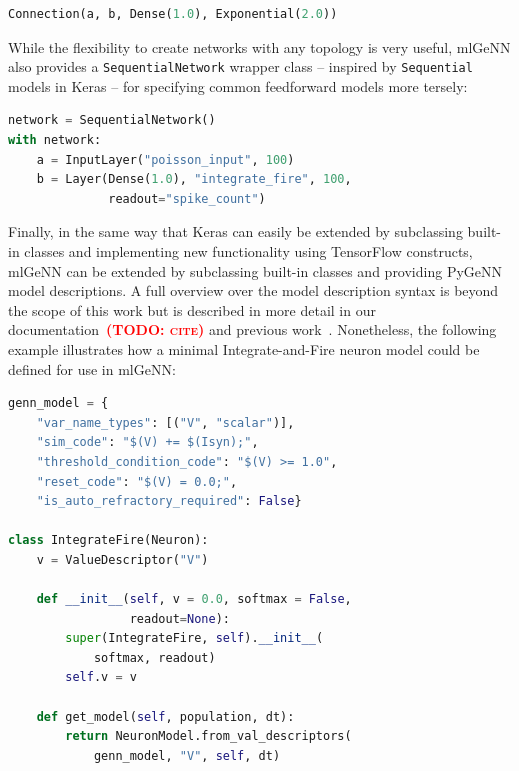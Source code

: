 \documentclass[sigconf]{acmart}
\newcommand{\todo}[1]{\textbf{\textsc{\textcolor{red}{(TODO: #1)}}}}
\begin{document}
\begin{lstlisting}[language=Python]
Connection(a, b, Dense(1.0), Exponential(2.0))
\end{lstlisting}

While the flexibility to create networks with any topology is very useful, mlGeNN also provides a \lstinline{SequentialNetwork} wrapper class -- inspired by \lstinline{Sequential} models in Keras -- for specifying common feedforward models more tersely:
\begin{lstlisting}[language=Python]
network = SequentialNetwork()
with network:
    a = InputLayer("poisson_input", 100)
    b = Layer(Dense(1.0), "integrate_fire", 100,
              readout="spike_count")
\end{lstlisting}
Finally, in the same way that Keras can easily be extended by subclassing built-in classes and implementing new functionality using TensorFlow constructs, mlGeNN can be extended by subclassing  built-in classes and providing PyGeNN model descriptions. 
A full overview over the model description syntax is beyond the scope of this work but is described in more detail in our documentation~\todo{cite} and previous work~\citep{Knight2021}.
Nonetheless, the following example illustrates how a minimal Integrate-and-Fire neuron model could be defined for use in mlGeNN:
\begin{lstlisting}[language=Python]
genn_model = {
    "var_name_types": [("V", "scalar")],
    "sim_code": "$(V) += $(Isyn);",
    "threshold_condition_code": "$(V) >= 1.0",
    "reset_code": "$(V) = 0.0;",
    "is_auto_refractory_required": False}

class IntegrateFire(Neuron):
    v = ValueDescriptor("V")

    def __init__(self, v = 0.0, softmax = False, 
                 readout=None):
        super(IntegrateFire, self).__init__(
            softmax, readout)
        self.v = v

    def get_model(self, population, dt):
        return NeuronModel.from_val_descriptors(
            genn_model, "V", self, dt)
\end{lstlisting}
\end{document}
